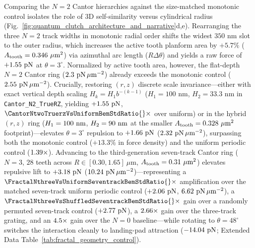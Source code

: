 \documentclass[pdflatex,sn-nature]{sn-jnl}
\DeclareRobustCommand{\roundtwo}[1]{\fpeval{round(#1,2)}}
\DeclareRobustCommand{\roundthree}[1]{\fpeval{round(#1,3)}}
\begin{document}
Comparing the $N=2$ Cantor hierarchies against the size-matched monotonic control isolates the role of 3D self-similarity versus cylindrical radius (Fig.~\ref{fig:quantum_clutch_architecture_and_narrative}d,e). Rearranging the three $N=2$ track widths in monotonic radial order shifts the widest $350\text{ nm}$ slot to the outer radius, which increases the active tooth planform area by $+5.7\%$ ($A_{\rm tooth} = \roundthree{\FractalCtrlSizematchedMonotonicActiveToothAreaUmtwo}\ \mu\text{m}^2$) via azimuthal arc length ($R\Delta\theta$) and yields a raw force of $+\roundtwo{\CtrlSizematchedMonotonicBemThetathreeFZPn}\text{ pN}$ at $\theta=3^\circ$. Normalized by active tooth area, however, the flat-depth $N=2$ Cantor ring ($\roundtwo{\FractalCantorFlatzFRepPnPerUmtwo}\text{ pN}\,\mu\text{m}^{-2}$) already exceeds the monotonic control ($\roundtwo{\FractalCtrlSizematchedMonotonicFRepPnPerUmtwo}\text{ pN}\,\mu\text{m}^{-2}$). Crucially, restoring $(r,z)$ discrete scale invariance---either with exact vertical depth scaling $H_k = H_1 b^{-(k-1)}$ ($H_1 = 100\text{ nm}$, $H_2 = 33.3\text{ nm}$ in \texttt{Cantor\_N2\_TrueRZ}, yielding $+\roundtwo{\CantorNtwoTruerzBemThetathreeFZPn}\text{ pN}$, $\CantorNtwoTruerzVsUniformBemStdRatio{}\times$ over uniform) or in the hybrid $(r,z)$ ring ($H_1 = 100{}\text{ nm}$, $H_2 = 90{}\text{ nm}$ at the smaller $A_{\rm tooth} = \roundthree{\FractalCantorRzScalematchedActiveToothAreaUmtwo}\ \mu\text{m}^2$ footprint)---elevates $\theta=3^\circ$ repulsion to $+\roundtwo{\CantorNtwoHybridrzBemStdFZPn}\text{ pN}$ ($\roundtwo{\FractalCantorRzScalematchedFRepPnPerUmtwo}\text{ pN}\,\mu\text{m}^{-2}$), surpassing both the monotonic control ($+13.3\%$ in force density) and the uniform periodic control ($1.39{}\times$). Advancing to the third-generation seven-track Cantor ring ($N=3$, $28$ teeth across $R \in [0.30, 1.65]\ \mu\text{m}$, $A_{\rm tooth} = \roundthree{\NatureFractalNthreeCantorseventrackFullToothPlanformAreaUmtwo}\ \mu\text{m}^2$) elevates repulsive lift to $+\roundtwo{\FractalNthreeCantorseventrackBemThetathreeFZPn}\text{ pN}$ ($\roundtwo{\NatureFractalNthreeCantorseventrackFRepPnPerToothAreaUmtwo}\text{ pN}\,\mu\text{m}^{-2}$)---representing a $\FractalNthreeVsUniformSeventrackBemStdRatio{}\times$ amplification over the matched seven-track uniform periodic control ($+\roundtwo{\CtrlNthreeUniformseventrackBemThetathreeFZPn}\text{ pN}$, $\roundtwo{\NatureCtrlNthreeUniformseventrackFRepPnPerToothAreaUmtwo}\text{ pN}\,\mu\text{m}^{-2}$), a $\FractalNthreeVsShuffledSeventrackBemStdRatio{}\times$ gain over a randomly permuted seven-track control ($+\roundtwo{\CtrlNthreeShuffledseventrackBemThetathreeFZPn}\text{ pN}$), a $2.66{}\times$ gain over the three-track grating, and an $4.5{}\times$ gain over the $N=0$ baseline---while rotating to $\theta=48^\circ$ switches the interaction cleanly to landing-pad attraction ($\roundtwo{\FractalNthreeCantorseventrackBemThetafoureightFZPn}\text{ pN}$; Extended Data Table~\ref{tab:fractal_geometry_control}).
\end{document}
